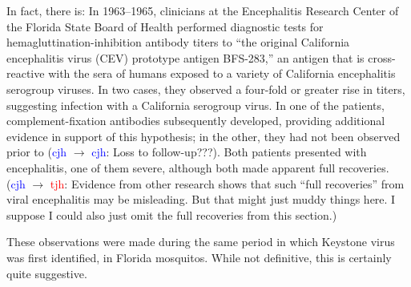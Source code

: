 \documentclass[12pt]{article}
\newcommand{\cjh}{\textcolor{blue}{cjh}}
\newcommand{\tjh}{\textcolor{red}{tjh}}
\newcommand{\msg}[3]{(#1 $\rightarrow$ #2: #3)}
\newcommand{\mcc}[1]{\msg\cjh\cjh{#1}}
\newcommand{\mct}[1]{\msg\cjh\tjh{#1}}
\begin{document}
        In fact, there is: In 1963--1965, clinicians at the Encephalitis Research Center of the Florida State Board of Health performed diagnostic tests for hemagluttination-inhibition antibody titers to ``the original California encephalitis virus (CEV) prototype antigen BFS-283,'' an antigen that is cross-reactive with the sera of humans exposed to a variety of California encephalitis serogroup viruses. In two cases, they observed a four-fold or greater rise in titers, suggesting infection with a California serogroup virus. In one of the patients, complement-fixation antibodies subsequently developed, providing additional evidence in support of this hypothesis; in the other, they had not been observed prior to \mcc{Loss to follow-up???}. Both patients presented with encephalitis, one of them severe, although both made apparent full recoveries. \mct{Evidence from other research shows that such ``full recoveries'' from viral encephalitis may be misleading. But that might just muddy things here. I suppose I could also just omit the full recoveries from this section.}

    These observations were made during the same period in which Keystone virus was first identified, in Florida mosquitos. While not definitive, this is certainly quite suggestive. %
    
\end{document}
